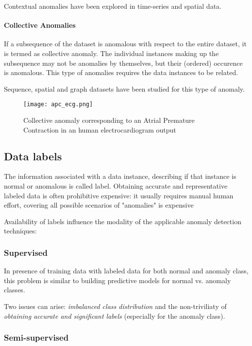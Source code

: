 Contextual anomalies have been explored in time-series and spatial data.

\paragraph{Collective Anomalies} If a subsequence of the dataset is anomalous with respect to the entire dataset, it is termed as collective anomaly. The individual instances making up the subsequence may not be anomalies by themselves, but their (ordered) occurence is anomalous. This type of anomalies requires the data instances to be related.

Sequence, spatial and graph datasets have been studied for this type of anomaly.

\begin{figure}
	\centerline{
		\texttt{[image: apc\_ecg.png]}}
	\caption{ Collective anomaly corresponding to an Atrial Premature Contraction in an human electrocardiogram output \cite{Goldberger2000PhysioBankPA} \cite{chandola2009anomaly}}
	\label{fig:apc_ecg}
\end{figure}


\subsection{Data labels}

The information associated with a data instance, describing if that instance is normal or anomalous is called label. Obtaining accurate and representative labeled data is often prohibitive expensive: it usually requires manual human effort, covering all possible scenarios of "anomalies" is expensive

Availability of labels influence the modality of the applicable anomaly detection techniques:

\subsubsection{Supervised}

In presence of training data with labeled data for both normal and anomaly class, this problem is similar to building predictive models for normal vs. anomaly classes.

Two issues can arise: \textit{imbalanced class distribution} and the non-triviliaty of \textit{obtaining accurate and significant labels} (especially for the anomaly class).


\subsubsection{Semi-supervised}


